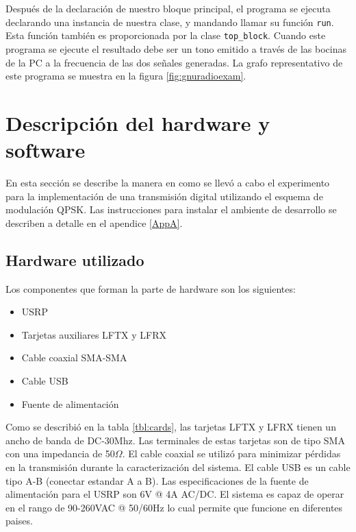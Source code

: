 Despu\'es de la declaraci\'on de nuestro bloque principal, el programa se
ejecuta declarando una instancia de nuestra clase, y mandando llamar su
funci\'on \verb|run|. Esta funci\'on tambi\'en es proporcionada por la clase
\verb|top_block|. Cuando este programa se ejecute el resultado debe ser un tono
emitido a trav\'es de las bocinas de la PC a la frecuencia de las dos se\~nales
generadas. La grafo representativo de este programa se muestra en la figura
\ref{fig:gnuradioexam}.

\section{Descripci\'on del hardware y software}
En esta secci\'on se describe la manera en como se llev\'o a cabo el experimento para la
implementaci\'on de una transmisi\'on digital utilizando el esquema de modulaci\'on QPSK. Las
instrucciones para instalar el ambiente de desarrollo se describen a detalle en el apendice
\ref{AppA}.

\subsection{Hardware utilizado}
Los componentes que forman la parte de hardware son los siguientes:

\begin{itemize}
  \item USRP
  \item Tarjetas auxiliares LFTX y LFRX
  \item Cable coaxial SMA-SMA
  \item Cable USB
  \item Fuente de alimentaci\'on
\end{itemize} 

Como se describi\'o en la tabla \ref{tbl:cards}, las tarjetas LFTX y LFRX tienen un ancho de banda
de DC-30Mhz. Las terminales de estas tarjetas son de tipo SMA con una impedancia de 50$\Omega$. El
cable coaxial se utiliz\'o para minimizar p\'erdidas en la transmisi\'on durante la caracterizaci\'on
del sistema. El cable USB es un cable tipo A-B (conectar estandar A a B). Las especificaciones de la
fuente de alimentaci\'on para el USRP son 6V @ 4A AC/DC. El sistema es capaz de operar en el rango
de 90-260VAC @ 50/60Hz lo cual permite que funcione en diferentes paises.


